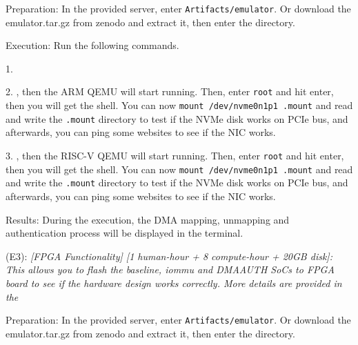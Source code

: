 \begin{compactdesc}
\begin{asparadesc}
        \vspace{6pt}
        \item[Preparation:] In the provided server, enter \texttt{Artifacts/emulator}. Or download the emulator.tar.gz from zenodo and extract it, then enter the  directory.

        \vspace{6pt}
        \item[Execution:] Run the following commands. 

        1. 

        2. , then the ARM QEMU will start running. Then, enter \texttt{root} and hit enter, then you will get the shell. You can now \texttt{mount /dev/nvme0n1p1 .mount} and read and write the \texttt{.mount} directory to test if the NVMe disk works on PCIe bus, and afterwards, you can ping some websites to see if the NIC works.

        3. , then the RISC-V QEMU will start running. Then, enter \texttt{root} and hit enter, then you will get the shell. You can now \texttt{mount /dev/nvme0n1p1 .mount} and read and write the \texttt{.mount} directory to test if the NVMe disk works on PCIe bus, and afterwards, you can ping some websites to see if the NIC works.
        \vspace{6pt}

        \item[Results:] During the execution, the DMA mapping, unmapping and authentication process will be displayed in the terminal.
    \end{asparadesc}

    \vspace{8pt}

    \item[(E3):] \textit{[FPGA Functionality] [1 human-hour + 8 compute-hour + 20GB disk]: This allows you to flash the baseline, iommu and DMAAUTH SoCs to FPGA board to see if the hardware design works correctly. More details are provided in the} 

    \begin{asparadesc}

        \vspace{6pt}
        \item[Preparation:] In the provided server, enter \texttt{Artifacts/emulator}. Or download the emulator.tar.gz from zenodo and extract it, then enter the  directory.
        \vspace{6pt}


\end{asparadesc}
\end{compactdesc}
